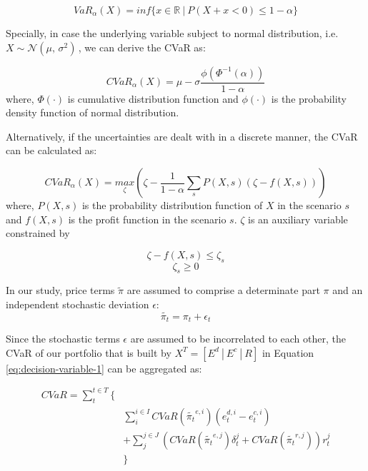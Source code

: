 \begin{equation}
\label{VaR}
VaR_\alpha(X) = inf \{x \in \mathbb{R}~|~ P(X+x<0)\leq 1-\alpha\}
\end{equation}

Specially, in case the underlying variable subject to normal distribution, i.e. $X \sim \mathcal{N}(\mu,\,\sigma^{2})\,$, we can derive the CVaR as:

\begin{equation}
CVaR_\alpha(X) = \mu - \sigma \frac{\phi(\Phi^{-1}(\alpha))}{1-\alpha}
\end{equation}
where, $\Phi(\cdot)$ is cumulative distribution function and $\phi(\cdot)$ is the probability density function of normal distribution.

Alternatively, if the uncertainties are dealt with in a discrete manner, the CVaR can be calculated as\cite{Rockafellar2000}:

\begin{equation}
CVaR_\alpha (X) = \underset{\zeta}{max}\left( \zeta - \frac{1}{1-\alpha} \sum_{s} P(X,s) (\zeta - f(X,s))\right)
\end{equation}
where, $P(X,s)$ is the probability distribution function of $X$ in the scenario $s$ and $f(X,s)$ is the profit function in the scenario $s$. $\zeta$ is an auxiliary variable constrained by

\begin{equation*}
\zeta - f(X,s) \leq \zeta_s
\end{equation*}
\begin{equation*}
\zeta_s \geq 0
\end{equation*}

In our study, price terms $\tilde{\pi}$ are assumed to comprise a determinate part $\pi$ and an independent stochastic deviation $\epsilon$:
\begin{equation}
\label{eq:price-error}
\tilde{\pi_t}= \pi_t + \epsilon_t
\end{equation}

Since the stochastic terms $\epsilon$ are assumed to be incorrelated to each other, the CVaR of our portfolio that is built by  $X^T = [E^d~|~E^c~|~R]$
in Equation \eqref{eq:decision-variable-1} can be aggregated as:

\begin{equation}
\begin{aligned}
CVaR =\sum_{t}^{t \in T} \{&\\
&\sum_{i}^{i \in I}  CVaR(\tilde{\pi_t}^{e,i}) (e_t^{d,i} - e_t^{c,i})  \\
&+ \sum_{j}^{j \in J} \left(CVaR(\tilde{\pi_t}^{e,j}) \delta_t^{j} + CVaR(\tilde{\pi_t}^{r,j})\right) r_t^j \\
&\}
\end{aligned}
\end{equation}

